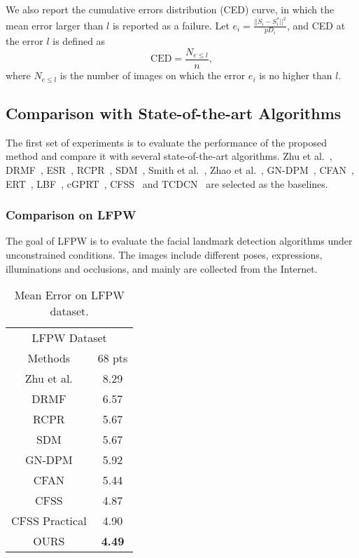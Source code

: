 \documentclass[journal]{IEEEtran}
\begin{document}
We also report the cumulative errors distribution (CED) curve, in which the mean error larger than $l$ is reported as a failure. Let $e_i =\frac{ ||S_i - S^{*}_i||^2}{pD_i}$, and CED at the error $l$ is defined as
\begin{equation}
\text{CED} = \frac{N_{e \leq l}}{n},
\end{equation}
where $N_{e \leq l}$ is the number of images on which the error $e_i$ is no higher than $l$.


\subsection{Comparison with State-of-the-art Algorithms}
The first set of experiments is to evaluate the performance of the proposed method and compare it with several state-of-the-art algorithms. Zhu et al.~\cite{zhu2012face},  DRMF~\cite{asthana2013robust}, ESR~\cite{cao2014face}, RCPR~\cite{burgos2013robust}, SDM~\cite{sdm}, Smith et al.~\cite{smith2014nonparametric}, Zhao et al.~\cite{zhao2014unified}, GN-DPM~\cite{tzimiropoulos2014gauss}, CFAN~\cite{zhang2014coarse}, ERT~\cite{kazemi2014one}, LBF~\cite{lbf}, cGPRT~\cite{lee2015face}, CFSS~\cite{cfss} and TCDCN~\cite{zhang2015learning} are selected as the baselines.



\subsubsection{Comparison on LFPW}
The goal of LFPW is to evaluate the facial landmark detection algorithms under unconstrained conditions. The images include different poses, expressions, illuminations and occlusions, and mainly are collected from the Internet.

\begin{table}[h]
\small
    \centering \caption{Mean Error on LFPW dataset.}
    \begin{tabular}{c c }
        \hline
 \multicolumn{2}{c}{LFPW Dataset} \\
Methods & 68 pts \\
        \hline
 Zhu et al. & 8.29   \\

 DRMF  & 6.57 \\

 RCPR & 5.67 \\

 SDM & 5.67  \\

 GN-DPM & 5.92 \\

 CFAN & 5.44 \\

 CFSS & 4.87 \\

 CFSS Practical & 4.90   \\
 \hline

 OURS & \textbf{4.49} \\
 \hline
        \end{tabular}
    \label{lfpw}
\end{table}
\end{document}
